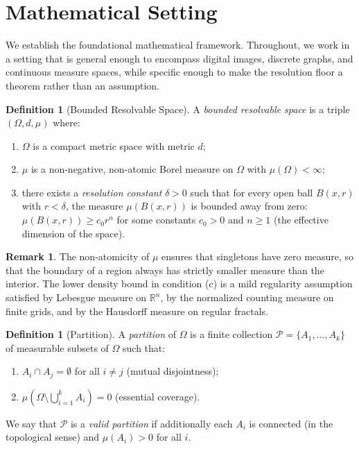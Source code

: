 \documentclass[twocolumn]{article}
\theoremstyle{plain}
\theoremstyle{definition}
\newtheorem{definition}[theorem]{Definition}
\newtheorem{remark}[theorem]{Remark}
\newcommand{\PP}{\mathcal{P}}
\newcommand{\reals}{\mathbb{R}}
\begin{document}
\section{Mathematical Setting}
\label{sec:setting}

We establish the foundational mathematical framework. Throughout, we work in a
setting that is general enough to encompass digital images, discrete graphs, and
continuous measure spaces, while specific enough to make the resolution floor
a theorem rather than an assumption.

\begin{definition}[Bounded Resolvable Space]
\label{def:brs}
A \emph{bounded resolvable space} is a triple $(\Omega, d, \mu)$ where:
\begin{enumerate}[label=(\alph*)]
\item $\Omega$ is a compact metric space with metric $d$;
\item $\mu$ is a non-negative, non-atomic Borel measure on $\Omega$ with
  $\mu(\Omega) < \infty$;
\item there exists a \emph{resolution constant} $\delta > 0$ such that for every
  open ball $B(x, r)$ with $r < \delta$, the measure $\mu(B(x,r))$ is bounded
  away from zero: $\mu(B(x,r)) \geq c_0 r^n$ for some constants $c_0 > 0$ and
  $n \geq 1$ (the effective dimension of the space).
\end{enumerate}
\end{definition}

\begin{remark}
The non-atomicity of $\mu$ ensures that singletons have zero measure, so that
the boundary of a region always has strictly smaller measure than the interior.
The lower density bound in condition (c) is a mild regularity assumption satisfied
by Lebesgue measure on $\reals^n$, by the normalized counting measure on finite
grids, and by the Hausdorff measure on regular fractals.
\end{remark}

\begin{definition}[Partition]
\label{def:partition}
A \emph{partition} of $\Omega$ is a finite collection $\PP = \{A_1, \ldots, A_k\}$
of measurable subsets of $\Omega$ such that:
\begin{enumerate}[label=(\alph*)]
\item $A_i \cap A_j = \emptyset$ for all $i \neq j$ (mutual disjointness);
\item $\mu\!\left(\Omega \setminus \bigcup_{i=1}^k A_i\right) = 0$ (essential coverage).
\end{enumerate}
We say that $\PP$ is a \emph{valid partition} if additionally each $A_i$ is
connected (in the topological sense) and $\mu(A_i) > 0$ for all $i$.
\end{definition}
\end{document}
